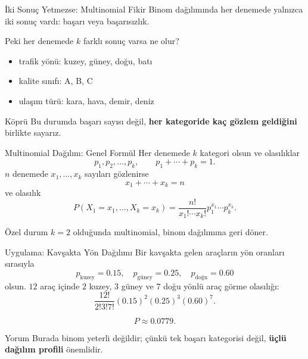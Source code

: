 \documentclass[light]{lutbeamer}
\begin{document}
\begin{frame}{İki Sonuç Yetmezse: Multinomial Fikir}
    \small
    Binom dağılımında her denemede yalnızca iki sonuç vardı: başarı veya başarısızlık.

    \vspace{0.2cm}
    Peki her denemede \(k\) farklı sonuç varsa ne olur?

    \begin{itemize}
        \item trafik yönü: kuzey, güney, doğu, batı
        \item kalite sınıfı: A, B, C
        \item ulaşım türü: kara, hava, demir, deniz
    \end{itemize}

    \begin{exampleblock}{Köprü}
        Bu durumda başarı sayısı değil, \textbf{her kategoride kaç gözlem geldiğini} birlikte sayarız.
    \end{exampleblock}
\end{frame}

\begin{frame}{Multinomial Dağılım: Genel Formül}
    \small
    Her denemede \(k\) kategori olsun ve olasılıklar
    \[
    p_1,p_2,\dots,p_k, \qquad p_1+\cdots+p_k=1.
    \]
    \(n\) denemede \(x_1,\dots,x_k\) sayıları gözlenirse
    \[
    x_1+\cdots+x_k=n
    \]
    ve olasılık
    \[
    P(X_1=x_1,\dots,X_k=x_k)=
    \frac{n!}{x_1!\cdots x_k!}p_1^{x_1}\cdots p_k^{x_k}.
    \]

    \begin{block}{Özel durum}
        \(k=2\) olduğunda multinomial, binom dağılımına geri döner.
    \end{block}
\end{frame}

\begin{frame}{Uygulama: Kavşakta Yön Dağılımı}
    \small
    Bir kavşakta gelen araçların yön oranları sırasıyla
    \[
    p_{\text{kuzey}}=0.15,\quad p_{\text{güney}}=0.25,\quad p_{\text{doğu}}=0.60
    \]
    olsun. \(12\) araç içinde \(2\) kuzey, \(3\) güney ve \(7\) doğu yönlü araç görme olasılığı:
    \[
    \frac{12!}{2!3!7!}(0.15)^2(0.25)^3(0.60)^7.
    \]

    \[
    P\approx 0.0779.
    \]

    \begin{exampleblock}{Yorum}
        Burada binom yeterli değildir; çünkü tek başarı kategorisi değil, \textbf{üçlü dağılım profili} önemlidir.
    \end{exampleblock}
\end{frame}
\end{document}
